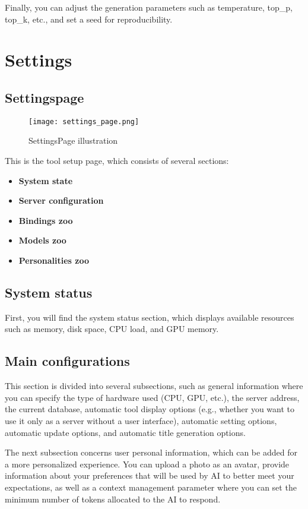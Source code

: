 \documentclass{article}
\begin{document}
Finally, you can adjust the generation parameters such as temperature, top_p, top_k, etc., and set a seed for reproducibility.

\section{Settings}

\subsection{Settingspage}
\begin{figure}[h]
  \centering
  \texttt{[image: settings\_page.png]}
  \caption{SettingsPage illustration}
\end{figure}

This is the tool setup page, which consists of several sections:
\begin{itemize}[noitemsep,topsep=0pt]
\item \textbf{System state}
\item \textbf{Server configuration}
\item \textbf{Bindings zoo}
\item \textbf{Models zoo}
\item \textbf{Personalities zoo}
\end{itemize}

\subsection{System status}

First, you will find the system status section, which displays available resources such as memory, disk space, CPU load, and GPU memory.

\subsection{Main configurations}

This section is divided into several subsections, such as general information where you can specify the type of hardware used (CPU, GPU, etc.), the server address, the current database, automatic tool display options (e.g., whether you want to use it only as a server without a user interface), automatic setting options, automatic update options, and automatic title generation options.

The next subsection concerns user personal information, which can be added for a more personalized experience. You can upload a photo as an avatar, provide information about your preferences that will be used by AI to better meet your expectations, as well as a context management parameter where you can set the minimum number of tokens allocated to the AI to respond.
\end{document}
